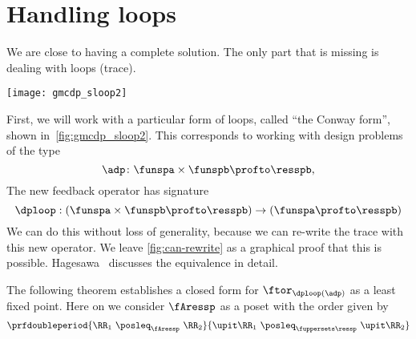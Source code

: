 \section{Handling loops}

We are close to having a complete solution.
The only part that is missing is dealing with loops (trace).

\begin{marginfigure}
    \texttt{[image: gmcdp\_sloop2]}
    \caption{}
    \label{fig:gmcdp_sloop2}
\end{marginfigure}

First, we will work with a particular form of loops, called ``the Conway form'',
shown in~\cref{fig:gmcdp_sloop2}.
This corresponds to working with design problems of the type
\begin{equation}
    \adp \colon \funspa \times \funspb  \profto \resspb,
\end{equation}
The new feedback operator has signature
\begin{equation}
    \dploop: (\funspa \times \funspb \profto \resspb) \to (\funspa \profto \resspb)
\end{equation}
%
We can do this without loss of generality, because we can re-write the trace
with this new operator.
We leave \cref{fig:can-rewrite} as a graphical proof that this is possible.
Hagesawa~\cite{hasegawa02uniformity} discusses the equivalence in detail.

\begin{figure*}[h]
    \hspace*{\fill}
    \hspace*{\fill}
    \hspace*{\fill}
    \caption{We can rewrite the trace in Conway's form.}
    \label{fig:can-rewrite}
\end{figure*}

The following theorem establishes a closed form for $\ftor_{\dploop(\adp)}$ as a least fixed point.
Here on we consider $\fAressp$ as a poset with the order given by
\begin{equation}
    \prfdoubleperiod{
        \RR_1 \  \posleq_{\fAressp} \ \RR_2
    }{
        \upit \RR_1 \ \posleq_{\fuppersets \ressp}\  \upit \RR_2
    }
\end{equation}

